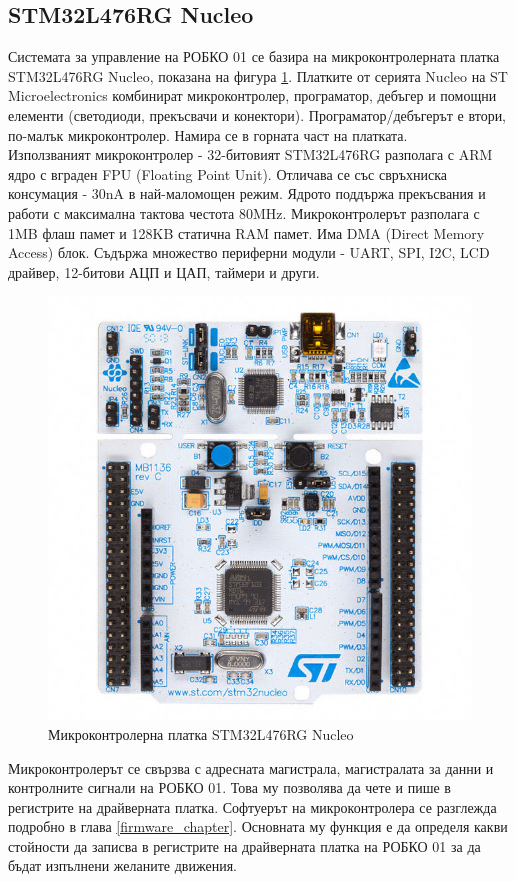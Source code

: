 \subsection{STM32L476RG Nucleo}
Системата за управление на РОБКО 01 се базира на микроконтролерната платка STM32L476RG Nucleo, показана на фигура \ref{fig:nucleo}. Платките от серията Nucleo на ST Microelectronics комбинират микроконтролер, програматор, дебъгер и помощни елементи (светодиоди, прекъсвачи и конектори).\cite{nucleo_man} Програматор/дебъгерът е втори, по-малък микроконтролер. Намира се в горната част на платката.\\
\indent{}
Използваният микроконтролер - 32-битовият STM32L476RG разполага с ARM ядро с вграден FPU (Floating Point Unit). Отличава се със свръхниска консумация - 30nA в най-маломощен режим. Ядрото поддържа прекъсвания и работи с максимална тактова честота 80MHz. Микроконтролерът разполага с 1MB флаш памет и 128KB статична RAM памет. Има DMA (Direct Memory Access) блок. Съдържа множество периферни модули - UART, SPI, I2C, LCD драйвер, 12-битови АЦП и ЦАП, таймери и други.
\cite{mcu_specs}\\
\indent{}
\begin{figure}[!thb]
    \centering
    \includegraphics[width=0.85\linewidth]{pictures/nucleo_board.jpg}
    \caption{Микроконтролерна платка STM32L476RG Nucleo}
    \label{fig:nucleo}
\end{figure}
\FloatBarrier
Микроконтролерът се свързва с адресната магистрала, магистралата за данни и контролните сигнали на РОБКО 01. Това му позволява да чете и пише в регистрите на драйверната платка. Софтуерът на микроконтролера се разглежда подробно в глава \ref{firmware_chapter}. Основната му функция е да определя какви стойности да записва в регистрите на драйверната платка на РОБКО 01 за да бъдат изпълнени желаните движения.
